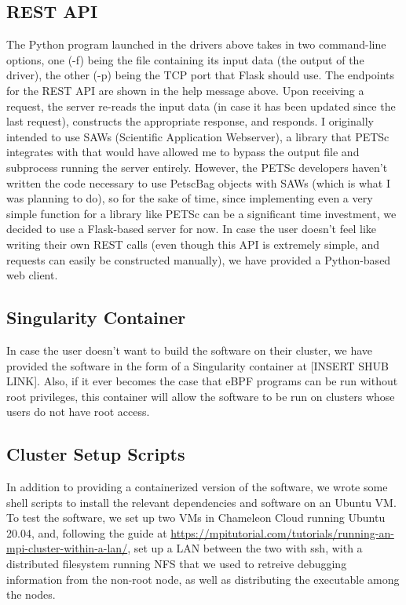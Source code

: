 \subsection*{REST API}
The Python program launched in the drivers above takes in two command-line options, one (-f) being the file containing its input data (the output of the driver), the other (-p) being the TCP port that Flask should use.
The endpoints for the REST API are shown in the help message above. Upon receiving a request, the server re-reads the input data (in case it has been updated since the last request), constructs the appropriate response, and responds. I originally intended to use SAWs (Scientific Application Webserver), a library that PETSc integrates with that would have allowed me to bypass the output file and subprocess running the server entirely. However, the PETSc developers haven't written the code necessary to use PetscBag objects with SAWs (which is what I was planning to do), so for the sake of time, since implementing even a very simple function for a library like PETSc can be a significant time investment, we decided to use a Flask-based server for now. In case the user doesn't feel like writing their own REST calls (even though this API is extremely simple, and requests can easily be constructed manually), we have provided a Python-based web client.
\subsection*{Singularity Container}
In case the user doesn't want to build the software on their cluster, we have provided the software in the form of a Singularity container at [INSERT SHUB LINK]. Also, if it ever becomes the case that eBPF programs can be run without root privileges, this container will allow the software to be run on clusters whose users do not have root access. 
\subsection*{Cluster Setup Scripts}
In addition to providing a containerized version of the software, we wrote some shell scripts to install the relevant dependencies and software on an Ubuntu VM. To test the software, we set up two VMs in Chameleon Cloud running Ubuntu 20.04, and, following the guide at \url{https://mpitutorial.com/tutorials/running-an-mpi-cluster-within-a-lan/}, set up a LAN between the two with ssh, with a distributed filesystem running NFS that we used to retreive debugging information from the non-root node, as well as distributing the executable among the nodes.

